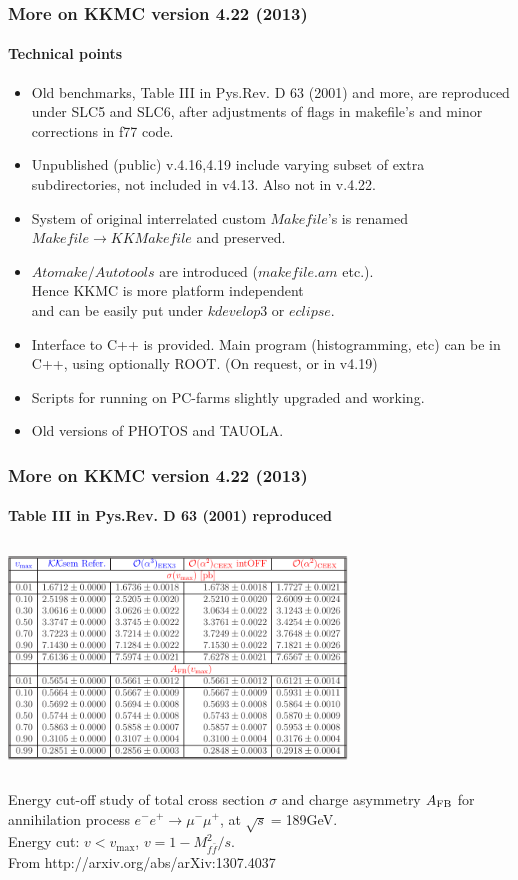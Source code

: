 \documentclass{beamer}
\begin{document}
\begin{frame}[fragile]
\frametitle{\bf More on KKMC version 4.22 (2013)}
\framesubtitle{\bf\large Technical points}
\small
\begin{itemize}
\item
Old benchmarks, Table III in Pys.Rev. D 63 (2001) and more,
are reproduced under SLC5 and SLC6, 
after adjustments of flags in makefile's
and minor corrections in f77 code.
\item
Unpublished (public) v.4.16,4.19 include varying subset of extra subdirectories,
not included in v4.13. Also not in v.4.22.
\item
System of original interrelated custom $Makefile$'s 
is renamed $Makefile\to KKMakefile$
and preserved.
\item
$Atomake/Autotools$ are introduced ($makefile.am$ etc.).\\
Hence KKMC is more platform independent\\
and can be easily put under $kdevelop3$ or $eclipse$.
\item
Interface to C++ is provided.
Main program (histogramming, etc) can be in C++, using optionally ROOT.
(On request, or in v4.19)
\item
Scripts for running on PC-farms slightly upgraded and working.
\item
Old versions of PHOTOS and TAUOLA.
\end{itemize}
\end{frame}

\begin{frame}[fragile]
\frametitle{\bf More on KKMC version 4.22 (2013)}
\framesubtitle{\bf\large Table III in Pys.Rev. D 63 (2001) reproduced}

\vspace{-2mm}
{\includegraphics[width=90mm,height=60mm]{afb_int2-tab1.pdf}}

\small
Energy cut-off study of
total cross section  $\sigma$ and charge asymmetry $A_{\rm FB}$
for annihilation process $e^-e^+ \to \mu^-\mu^+$, at $\sqrt{s}=$189GeV.\\
Energy cut: $v<v_{\max}$, $v=1-M^2_{f\bar{f}}/s$.\\
From http://arxiv.org/abs/arXiv:1307.4037
\end{frame}
\end{document}
